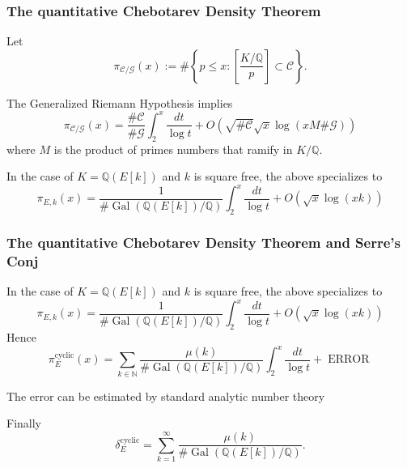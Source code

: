 \documentclass[10pt,handout]{beamer} %
\newcommand{\Q}{\mathbb Q}
\newcommand{\N}{\mathbb N}
\theoremstyle{definition}
\begin{document}
\begin{frame}
\frametitle{The quantitative Chebotarev Density Theorem}

 Let
$$\pi_{\mathcal C/\mathcal G}(x):=\#\left\{p\le x: \left[\frac{K/\Q}p\right]\subset \mathcal C\right\}.$$
\pause

\begin{theorem}
The Generalized Riemann Hypothesis implies
$$\pi_{\mathcal C/\mathcal G}(x)=
\frac{\#\mathcal C}{\#\mathcal G}\int_2^x\frac{dt}{\log t}+O\left(\sqrt{\#\mathcal C}\sqrt{x}\log(xM\#\mathcal G)\right)$$
where $M$ is the product of primes numbers that ramify in $K/\Q$.
\end{theorem}\pause

In the case of $K=\Q(E[k])$ and $k$ is square free, the above specializes to 
$$\pi_{E,k}(x)=\frac1{\#\operatorname{Gal}(\Q(E[k])/\Q)}\int_2^x\frac{dt}{\log t}+
O\left(\sqrt{x}\log(xk)\right)$$
\end{frame}

\begin{frame}
\frametitle{The quantitative Chebotarev Density Theorem and Serre's Conj}
In the case of $K=\Q(E[k])$ and $k$ is square free, the above specializes to 
$$\pi_{E,k}(x)=\frac1{\#\operatorname{Gal}(\Q(E[k])/\Q)}\int_2^x\frac{dt}{\log t}+
O\left(\sqrt{x}\log(xk)\right)$$\pause
Hence
$$\pi_E^{\text{cyclic}}(x)=\sum_{k\in\N}\frac{\mu(k)}{\#\operatorname{Gal}(\Q(E[k])/\Q)}\int_2^x\frac{dt}{\log t}
+\operatorname{ERROR}$$\pause

The error can be estimated by standard analytic number theory\pause

Finally
$$\delta_E^{\text{cyclic}}=\sum_{k=1}^\infty\frac{\mu(k)}{\#\operatorname{Gal}(\Q(E[k])/\Q)}.$$
\end{frame}
\end{document}
